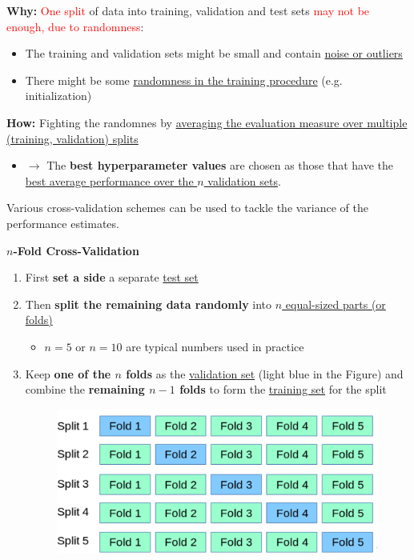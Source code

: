 \documentclass[12pt, a4paper]{article}
\begin{document}
\textbf{Why:} \textcolor{red}{One split} of data into training, validation and test sets \textcolor{red}{may not be enough, due to randomness}:

\begin{itemize}
  \item The training and validation sets might be small and contain \uline{noise or outliers}
  \item There might be some \uline{randomness in the training procedure} (e.g. initialization)
\end{itemize}


\textbf{How:} Fighting the randomnes by \uline{averaging the evaluation measure over multiple (training, validation) splits}
\begin{itemize}
  \item $\rightarrow$ The \textbf{best hyperparameter values} are chosen as those that have the \uline{best average performance over the $n$ validation sets}.
\end{itemize}

\bigskip


Various cross-validation schemes can be used to tackle the variance of the performance estimates.


\textbf{$n$-Fold Cross-Validation}

\begin{enumerate}
  \item First \textbf{set a side} a separate \uline{test set}
  \item Then \textbf{split the remaining data randomly} into \uline{$n$ equal-sized parts (or folds)}
  \begin{itemize}
    \item $n = 5$ or $n = 10$ are typical numbers used in practice
  \end{itemize}
  \item Keep \textbf{one of the $n$ folds} as the \uline{validation set} (light blue in the Figure) and combine the \textbf{remaining $n - 1$ folds} to form the \uline{training set} for the split
  \begin{figure}[H]
    \centering  %
      \includegraphics[width=0.6\columnwidth]{images/n-fold-cv.png}
      \label{fig:n-fold-cv}
  \end{figure}
\end{enumerate}
\end{document}
